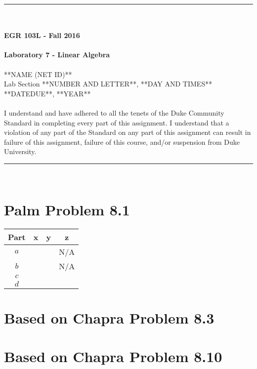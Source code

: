 \documentclass{article}
\begin{document}
\begin{center}
\rule{6.5in}{0.5mm}\\~\\
{\bf \large EGR 103L - Fall 2016}\\~\\
{\huge \bf Laboratory 7 - Linear Algebra}\\~\\
**NAME (NET ID)**\\
Lab Section **NUMBER AND LETTER**, **DAY AND TIMES**\\
**DATEDUE**, **YEAR**\\~\\
{\small  I understand and have adhered to all the tenets of the Duke
  Community Standard in completing every part of this assignment.  I
  understand that a violation of any part of the Standard on any part
  of this assignment can result in failure of this assignment, failure
  of this course, and/or suspension from Duke University.} 
\rule{6.5in}{0.5mm}\\
\end{center}
\tableofcontents
\listoffigures
\pagebreak
\section{Palm Problem 8.1}
\renewcommand{\arraystretch}{1.5}
\begin{center}
\begin{tabular}{|c||c|c|c|}\hline
Part & x & y & z \\ \hline \hline
$a$ &  &  & N/A\\ \hline
$b$ &  &  & N/A \\ \hline
$c$ &  &  & \\ \hline
$d$ &  &  & \\ \hline
\end{tabular}
\end{center}

\section{Based on Chapra Problem 8.3}

\section{Based on Chapra Problem 8.10}
\end{document}
